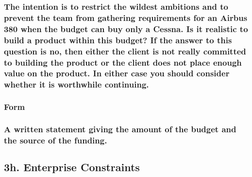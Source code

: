 \documentclass[
]{article}
\begin{document}
\hypertarget{the-intention-is-to-restrict-the-wildest-ambitions-and-to-prevent-the-team-from-gathering-requirements-for-an-airbus-380-when-the-budget-can-buy-only-a-cessna.-is-it-realistic-to-build-a-product-within-this-budget-if-the-answer-to-this-question-is-no-then-either-the-client-is-not-really-committed-to-building-the-product-or-the-client-does-not-place-enough-value-on-the-product.-in-either-case-you-should-consider-whether-it-is-worthwhile-continuing.}{%
\subsubsection{The intention is to restrict the wildest ambitions and to
prevent the team from gathering requirements for an Airbus 380 when the
budget can buy only a Cessna. Is it realistic to build a product within
this budget? If the answer to this question is no, then either the
client is not really committed to building the product or the client
does not place enough value on the product. In either case you should
consider whether it is worthwhile
continuing.}\label{the-intention-is-to-restrict-the-wildest-ambitions-and-to-prevent-the-team-from-gathering-requirements-for-an-airbus-380-when-the-budget-can-buy-only-a-cessna.-is-it-realistic-to-build-a-product-within-this-budget-if-the-answer-to-this-question-is-no-then-either-the-client-is-not-really-committed-to-building-the-product-or-the-client-does-not-place-enough-value-on-the-product.-in-either-case-you-should-consider-whether-it-is-worthwhile-continuing.}}

\hypertarget{form-16}{%
\subsubsection{Form}\label{form-16}}

\hypertarget{a-written-statement-giving-the-amount-of-the-budget-and-the-source-of-the-funding.}{%
\subsubsection{\texorpdfstring{A written statement giving the amount of
the budget and the source of the funding.
}{A written statement giving the amount of the budget and the source of the funding. }}\label{a-written-statement-giving-the-amount-of-the-budget-and-the-source-of-the-funding.}}

\hypertarget{h.-enterprise-constraints}{%
\subsection{3h. Enterprise
Constraints}\label{h.-enterprise-constraints}}
\end{document}
